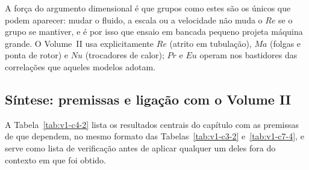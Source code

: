\documentclass[12pt,a4paper]{article}
\numberwithin{equation}{section}
\numberwithin{table}{section}
\numberwithin{figure}{section}
\begin{document}
A força do argumento dimensional é que grupos como estes são os únicos que
podem aparecer: mudar o fluido, a escala ou a velocidade não muda o $Re$ se o
grupo se mantiver, e é por isso que ensaio em bancada pequeno projeta máquina
grande. O Volume~II usa explicitamente $Re$ (atrito em tubulação), $Ma$
(folgas e ponta de rotor) e $Nu$ (trocadores de calor); $Pr$ e $Eu$ operam
nos bastidores das correlações que aqueles modelos adotam.

\subsection{Síntese: premissas e ligação com o Volume
II}\label{sub:v1-c4-sintese}

A Tabela~\ref{tab:v1-c4-2} lista os resultados centrais do capítulo com as
premissas de que dependem, no mesmo formato das
Tabelas~\ref{tab:v1-c3-2} e~\ref{tab:v1-c7-4}, e serve como lista de
verificação antes de aplicar qualquer um deles fora do contexto em que foi
obtido.
\end{document}
